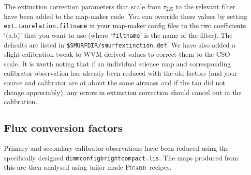 \documentclass[twoside,11pt]{article}
\newcommand{\xref}[3]{#1}
\newcommand{\xlabel}[1]{}
\renewcommand{\_}{\texttt{\symbol{95}}}
\newcommand{\picard}{\xref{\textsc{Picard}}{sun265}{}}
\newcommand{\param}[1]{\texttt{#1}}
\begin{document}
The extinction correction parameters that scale from $\tau_{225}$ to the relevant filter have been added to the map-maker code. You can override these values by setting \param{ext.taurelation.filtname} in your map-maker config files to the two coefficients `(a,b)' that you want to use (where `\texttt{filtname}' is the name of the filter). The defaults are listed in \texttt{\$SMURF\_DIR/smurf\_extinction.def}. We have also added a slight calibration tweak to WVM-derived values to correct them to the CSO scale. It is worth noting that if an individual science map and corresponding calibrator observation has already been reduced with the old factors (and your source and calibrator are at about the same airmass and if the tau did not change appreciably), any errors in extinction correction should cancel out in the calibration.


\subsection{\xlabel{fcf}Flux conversion factors}
\label{sec:fcf}

Primary and secondary calibrator observations have been reduced using
the specifically designed
\texttt{dimmconfig\_bright\_compact.lis}. The maps produced from this
are then analysed using tailor-made \picard\ recipes. 
\end{document}
